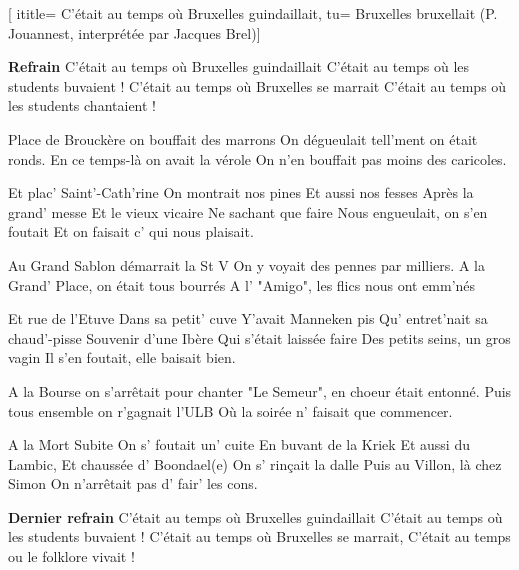 [
ititle= {C'était au temps où Bruxelles guindaillait},
tu= {Bruxelles bruxellait (P. Jouannest, interprétée par Jacques Brel)}]

\beginchorus
\textbf {Refrain}
C'était au temps où Bruxelles guindaillait
C'était au temps où les students buvaient !
C'était au temps où Bruxelles se marrait
C'était au temps où les students chantaient !
\endchorus

\beginverse
Place de Brouckère on bouffait des marrons
On dégueulait tell'ment on était ronds.
En ce temps-là on avait la vérole
On n'en bouffait pas moins des caricoles.

Et plac' Saint'-Cath'rine
On montrait nos pines
Et aussi nos fesses
Après la grand' messe
Et le vieux vicaire
Ne sachant que faire
Nous engueulait, on s'en foutait
Et on faisait c' qui nous plaisait.
\endverse

\beginverse
Au Grand Sablon démarrait la St V
On y voyait des pennes par milliers.
A la Grand' Place, on était tous bourrés
A l' "Amigo", les flics nous ont emm'nés

Et rue de l'Etuve
Dans sa petit' cuve
Y'avait Manneken pis
Qu' entret'nait sa chaud'-pisse
Souvenir d'une Ibère
Qui s'était laissée faire
Des petits seins, un gros vagin
Il s'en foutait, elle baisait bien.
\endverse

\beginverse
A la Bourse on s'arrêtait pour chanter
"Le Semeur", en choeur était entonné.
Puis tous ensemble on r'gagnait l'ULB
Où la soirée n' faisait que commencer.

A la Mort Subite
On s' foutait un' cuite
En buvant de la Kriek
Et aussi du Lambic,
Et chaussée d' Boondael(e)
On s' rinçait la dalle
Puis au Villon, là chez Simon
On n'arrêtait pas d' fair' les cons.
\endverse

\beginchorus
\textbf {Dernier refrain}
C'était au temps où Bruxelles guindaillait
C'était au temps où les students buvaient !
C'était au temps où Bruxelles se marrait,
C'était au temps ou le folklore vivait !
\endchorus

\endsong